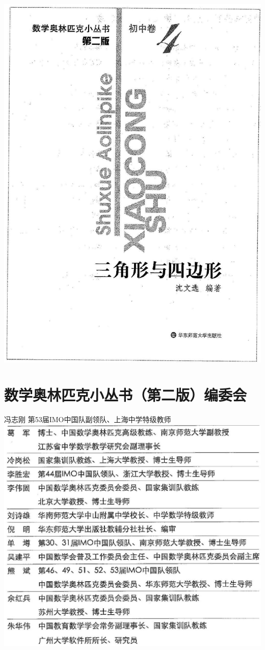 \documentclass[10pt]{article}
\begin{document}
\begin{center}
\includegraphics[max width=\textwidth]{2024_10_30_2c8f45efd4a519b08e1ag-001}
\end{center}

\section*{数学奥林匹克小丛书（第二版）编委会}
冯志刚 第53届IMO中国队副领队、上海中学特级教师\\
\includegraphics[max width=\textwidth, center]{2024_10_30_2c8f45efd4a519b08e1ag-002}
\end{document}
